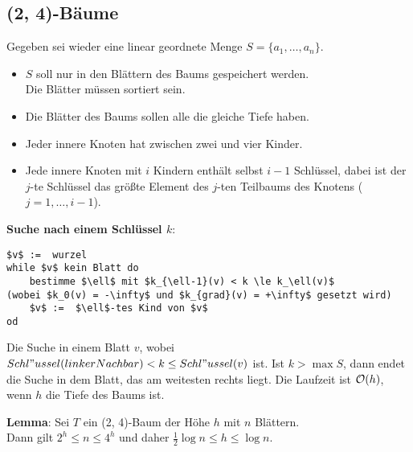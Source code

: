 \subsection{%
    (2, 4)-Bäume
}

Gegeben sei wieder eine linear geordnete Menge $S = \{a_1, \dotsc, a_n\}$.
\begin{itemize}
    \item
    $S$ soll nur in den Blättern des Baums gespeichert werden. \\
    Die Blätter müssen sortiert sein.
    
    \item
    Die Blätter des Baums sollen alle die gleiche Tiefe haben.
    
    \item
    Jeder innere Knoten hat zwischen zwei und vier Kinder.
    
    \item
    Jede innere Knoten mit $i$ Kindern enthält selbst $i - 1$ Schlüssel,
    dabei ist der $j$-te Schlüssel das größte Element des $j$-ten Teilbaums
    des Knotens ($j = 1, \dotsc, i - 1$).
\end{itemize}

\linie

\textbf{Suche nach einem Schlüssel $k$}:
\begin{lstlisting}
$v$ :=  wurzel
while $v$ kein Blatt do
    bestimme $\ell$ mit $k_{\ell-1}(v) < k \le k_\ell(v)$                              (wobei $k_0(v) = -\infty$ und $k_{grad}(v) = +\infty$ gesetzt wird)
    $v$ :=  $\ell$-tes Kind von $v$
od
\end{lstlisting}

Die Suche in einem Blatt $v$, wobei
$Schl"ussel(linkerNachbar) < k \le Schl"ussel(v)$ ist.
Ist $k > \max S$, dann endet die Suche in dem Blatt, das am weitesten rechts
liegt.
Die Laufzeit ist $\mathcal{O}(h)$, wenn $h$ die Tiefe des Baums ist.

\pagebreak

\textbf{Lemma}: Sei $T$ ein (2, 4)-Baum der Höhe $h$ mit $n$ Blättern. \\
Dann gilt $2^h \le n \le 4^h$ und daher $\frac{1}{2} \log n \le h \le \log n$.

\linie

